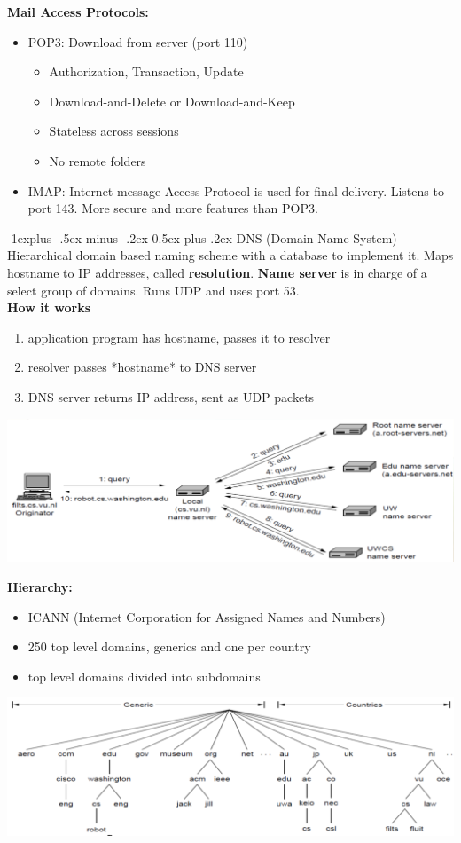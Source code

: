 \documentclass[letterpaper, 8pt]{extarticle}
\makeatletter
\renewcommand{\subsection}{\@startsection{subsection}{2}{0mm}%
                                {-1explus -.5ex minus -.2ex}%
                                {0.5ex plus .2ex}%
                                {\normalfont\small\bfseries}}
\makeatother
\begin{document}
\begin{multicols*}{4}
	\textbf{Mail Access Protocols:}
	\begin{itemize}
		\item POP3: Download from server (port 110)
		      \begin{itemize}
			      \item Authorization, Transaction, Update
			      \item Download-and-Delete or Download-and-Keep
			      \item Stateless across sessions
			      \item No remote folders
		      \end{itemize}
		\item IMAP: Internet message Access Protocol is used for final delivery. Listens to port 143. More secure and more features than POP3.
	\end{itemize}

	\subsection{DNS (Domain Name System)}
	Hierarchical domain based naming scheme with a database to implement it. Maps hostname to IP addresses, called \textbf{resolution}. \textbf{Name server} is in charge of a select group of domains. Runs UDP and uses port 53. \\

	\textbf{How it works}
	\begin{enumerate}
		\item application program has hostname, passes it to resolver
		\item resolver passes *hostname* to DNS server
		\item DNS server returns IP address, sent as UDP packets
	\end{enumerate}
	\includegraphics[width=\linewidth]{SCR-20250417-brck.png}

	\textbf{Hierarchy:}
	\begin{itemize}
		\item ICANN (Internet Corporation for Assigned Names and Numbers)
		\item 250 top level domains, generics and one per country
		\item top level domains divided into subdomains
	\end{itemize}
	\includegraphics[width=\linewidth]{SCR-20250417-bplh.png}


\end{multicols*}
\end{document}
